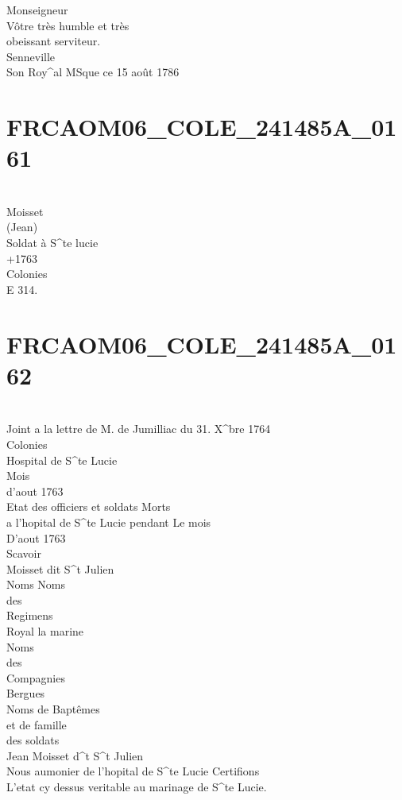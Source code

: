 \documentclass{article}
\begin{document}
\begin{pages}
Monseigneur\\
Vôtre très humble et très\\
obeissant serviteur.\\
Senneville
\pend\pstart
\\
Son Roy\^{}al MSque ce 15 août 1786
\pend
\endnumbering\beginnumbering\section{FRCAOM06\_COLE\_241485A\_0161}\pstart
\\
Moisset\\
(Jean)\\
Soldat à S\^{}te lucie\\
+1763\\
Colonies\\
E 314.
\pend
\endnumbering\beginnumbering\section{FRCAOM06\_COLE\_241485A\_0162}\pstart
\\
Joint a la lettre de M. de Jumilliac du 31. X\^{}bre 1764\\
Colonies\\
Hospital de S\^{}te Lucie\\
Mois\\
d'aout 1763\\
Etat des officiers et soldats Morts\\
a l'hopital de S\^{}te Lucie pendant Le mois\\
D'aout 1763\\
Scavoir\\
Moisset dit S\^{}t Julien
\pend\pstart
\\
Noms Noms\\
des\\
Regimens\\
Royal la marine
\pend\pstart
\\
Noms\\
des\\
Compagnies\\
Bergues
\pend\pstart
\\
Noms de Baptêmes\\
et de famille\\
des soldats\\
Jean Moisset d\^{}t S\^{}t Julien
\pend\pstart
\\
Nous aumonier de l'hopital de S\^{}te Lucie Certifions\\
L'etat cy dessus veritable au marinage de S\^{}te Lucie.\\

\end{pages}
\end{document}

